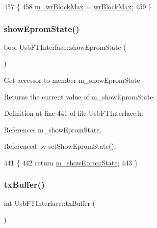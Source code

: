 \begin{DoxyCode}
457                                        \{
458     \hyperlink{classUsbFTInterface_ad0512841c67ea39da7701e990628059a}{m\_wrBlockMax} = \hyperlink{classUsbFTInterface_ad73d2d990fdda96ee53566daaeb73abc}{wrBlockMax};
459   \}
\end{DoxyCode}
\mbox{\label{classUsbFTInterface_a6e9b97244aaac289792fbef24daad33e}} 
\subsubsection{\texorpdfstring{show\+Eprom\+State()}{showEpromState()}}
{\footnotesize\ttfamily bool Usb\+F\+T\+Interface\+::show\+Eprom\+State (\begin{DoxyParamCaption}{ }\end{DoxyParamCaption})\hspace{0.3cm}{\ttfamily [inline]}}

Get accessor to member m\+\_\+show\+Eprom\+State \begin{DoxyReturn}{Returns}
the current value of m\+\_\+show\+Eprom\+State 
\end{DoxyReturn}


Definition at line 441 of file Usb\+F\+T\+Interface.\+h.



References m\+\_\+show\+Eprom\+State.



Referenced by set\+Show\+Eprom\+State().


\begin{DoxyCode}
441                          \{
442     \textcolor{keywordflow}{return} \hyperlink{classUsbFTInterface_aa5c215777af41de94a2b371c59c88c7c}{m\_showEpromState};
443   \}  
\end{DoxyCode}
\mbox{\label{classUsbFTInterface_acac73d3fc1587437656bb7fe24e10906}} 
\subsubsection{\texorpdfstring{tx\+Buffer()}{txBuffer()}}
{\footnotesize\ttfamily int Usb\+F\+T\+Interface\+::tx\+Buffer (\begin{DoxyParamCaption}{ }\end{DoxyParamCaption})\hspace{0.3cm}{\ttfamily [inline]}}

